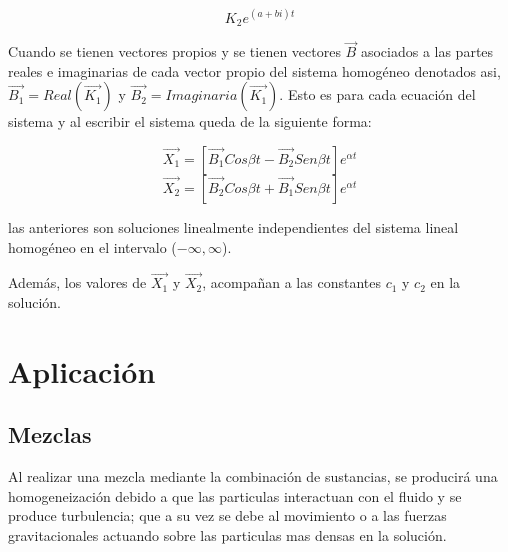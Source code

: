 \documentclass[titlepage]{article}
\begin{document}
                \begin{equation*}
                    K_2e^{(a+bi)t} 
                \end{equation*}\vspace{0.2cm}

            Cuando se tienen vectores propios y se tienen vectores $\vec{B}$ asociados a las partes reales e imaginarias de cada vector propio del sistema homogéneo denotados asi, 
            $\vec{B_1} = Real(\vec{K_1})$ y $\vec{B_2} =  Imaginaria(\vec{K_1})$. Esto es para cada ecuación del sistema y al escribir el sistema queda de la siguiente forma: \vspace{0.2cm}
            
                \begin{equation*}
                    \vec{X_1} = [\vec{B_1}Cos\beta t - \vec{B_2}Sen\beta t]e^{\alpha t}
                \end{equation*}\vspace{0.1cm} 
                \begin{equation*}
                    \vec{X_2} = [\vec{B_2}Cos\beta t + \vec{B_1}Sen\beta t]e^{\alpha t}
                \end{equation*}\vspace{0.2cm}  
            
            las anteriores son soluciones linealmente independientes del sistema lineal homogéneo en el intervalo ($-\infty,\infty$).\par 
            Además, los valores de  $\vec{X_1}$ y $ \vec{X_2}$, acompañan a las constantes $c_1$ y $c_2$ en la solución. \cite{Zill2002b}
                    
    \section{Aplicación}
        
        \subsection{Mezclas}
        
            Al realizar una mezcla mediante la combinación de sustancias, se producirá una homogeneización debido a que las particulas interactuan con el fluido y se produce turbulencia; que a su vez se debe al movimiento o a las fuerzas gravitacionales actuando sobre las particulas mas densas en la solución.\par\vspace{0.3cm}
            
\end{document}
